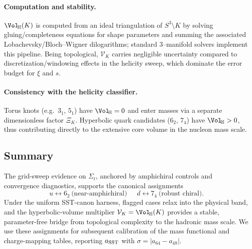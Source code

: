 \paragraph{Computation and stability.}
\(\Vol_{\!\mathbb{H}}(K)\) is computed from an ideal triangulation of \(S^3\!\setminus\!K\) by solving gluing/completeness equations for shape parameters and summing the associated Lobachevsky/Bloch–Wigner dilogarithms; standard 3–manifold solvers implement this pipeline. Being topological, \(\mathcal V_K\) carries negligible uncertainty compared to discretization/windowing effects in the helicity sweep, which dominate the error budget for \(\xi\) and \(s\).

\paragraph{Consistency with the helicity classifier.}
Torus knots (e.g.\ \(3_1\), \(5_1\)) have \(\Vol_{\!\mathbb{H}}=0\) and enter masses via a separate dimensionless factor \(\Xi_K\). Hyperbolic quark candidates (\(6_2\), \(7_4\)) have \(\Vol_{\!\mathbb{H}}>0\), thus contributing directly to the extensive core volume in the nucleon mass scale.

\subsection*{Summary}
The grid-sweep evidence on \(\Sigma_t\), anchored by amphichiral controls and convergence diagnostics, supports the canonical assignments
\[
	\boxed{u\!\leftrightarrow\!6_2\ \text{(near-amphichiral)}\quad\ \ d\!\leftrightarrow\!7_4\ \text{(robust chiral)}}.
\]
Under the uniform SST-canon harness, flagged cases relax into the physical band, and the hyperbolic-volume multiplier \(\mathcal V_K=\Vol_{\!\mathbb{H}}(K)\) provides a stable, parameter-free bridge from topological complexity to the hadronic mass scale. We use these assignments for subsequent calibration of the mass functional and charge-mapping tables, reporting \(a_{\rm SST}\) with \(\sigma=|a_{64}-a_{48}|\).
